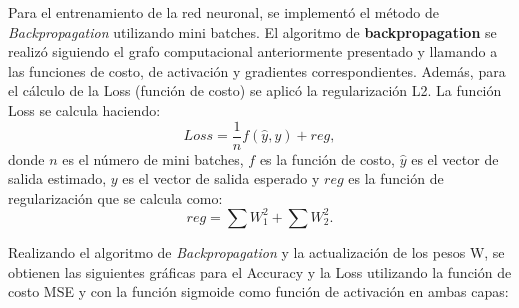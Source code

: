 Para el entrenamiento de la red neuronal, se implementó el método de \textit{Backpropagation} utilizando mini batches.
El algoritmo de \textbf{backpropagation} se realizó siguiendo el grafo computacional anteriormente presentado y llamando a las funciones de costo, de activación y gradientes correspondientes.
Además, para el cálculo de la Loss (función de costo) se aplicó la regularización L2. La función Loss se calcula haciendo:
\begin{equation*}
    Loss = \frac{1}{n} f(\hat{y}, y) + reg,
\end{equation*}
donde $n$ es el número de mini batches, $f$ es la función de costo, $\hat{y}$ es el vector de salida estimado, $y$ es el vector de salida esperado y $reg$ es la función de regularización que se calcula como:
\begin{equation*}
    reg = \sum W_1^2 + \sum W_2^2.
\end{equation*}

Realizando el algoritmo de \textit{Backpropagation} y la actualización de los pesos W, se obtienen las siguientes gráficas para el Accuracy y la Loss utilizando la función de costo MSE y con la función sigmoide como función de activación en ambas capas:

